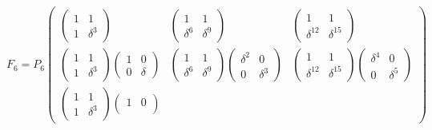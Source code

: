 \[
    F_6
    = P_6
    \begin{pmatrix}
        \begin{pmatrix}
            1 & 1        \\
            1 & \delta^3
        \end{pmatrix}
         &
        \begin{pmatrix}
            1        & 1        \\
            \delta^6 & \delta^9
        \end{pmatrix}
         &
        \begin{pmatrix}
            1           & 1           \\
            \delta^{12} & \delta^{15}
        \end{pmatrix}
        \\
        \begin{pmatrix}
            1 & 1        \\
            1 & \delta^3
        \end{pmatrix}
        \begin{pmatrix}
            1 & 0      \\
            0 & \delta
        \end{pmatrix}
         &
        \begin{pmatrix}
            1        & 1        \\
            \delta^6 & \delta^9
        \end{pmatrix}
        \begin{pmatrix}
            \delta^2 & 0        \\
            0        & \delta^3
        \end{pmatrix}
         &
        \begin{pmatrix}
            1           & 1           \\
            \delta^{12} & \delta^{15}
        \end{pmatrix}
        \begin{pmatrix}
            \delta^4 & 0        \\
            0        & \delta^5
        \end{pmatrix}
        \\
        \begin{pmatrix}
            1 & 1        \\
            1 & \delta^3
        \end{pmatrix}
        \begin{pmatrix}
            1 & 0        \\

\end{pmatrix}
\end{pmatrix}\]
